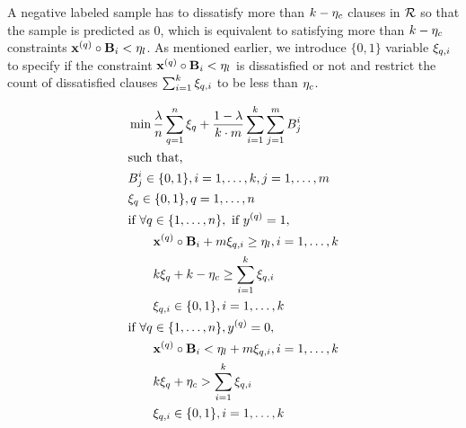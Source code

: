 A negative labeled sample has to dissatisfy  more than $ k-\eta_c $ clauses in $ {\mathcal{R}} $ so that the sample is predicted as $ 0 $, which is equivalent to satisfying  more than $ k-\eta_c$ constraints $ \mathbf{x}^{(q)}\circ \mathbf{B}_i < \eta_l  $. As mentioned earlier, we  introduce $ \{0, 1\} $ variable $ \xi_{q,i} $ to specify if the constraint $ \mathbf{x}^{(q)}\circ \mathbf{B}_i < \eta_l  $ is dissatisfied or not and  restrict the count of dissatisfied clauses $ \sum_{i=1}^k\xi_{q,i} $ to be less than $ \eta_c $. 



\begin{subequations}
	\label{interpretability_crr_eq:ilp}
 \begin{align} 	
 	&\min   \frac{\lambda}{n} \sum_{q=1}^n \xi_q + \frac{1-\lambda}{k\cdot m}\sum_{i=1}^k\sum_{j=1}^m B_j^i \label{interpretability_crr_eq:ilp_obj} \\
 	&\text{such that,} \notag \\
 	&B_j^i \in \{0,1\},  i = 1,\dots,k,  j = 1,\dots,m \label{interpretability_crr_eq:ilp_range}\\
 	& \xi_q \in \{0,1\},q = 1,\dots,n  \label{interpretability_crr_eq:ilp_range_2}\\
 	&\text{if }  \forall q \in \{1,\dots,n\},\text{ if }  y^{(q)}=1, \label{interpretability_crr_eq:ilp_pos}\\
 	&\qquad \mathbf{x}^{(q)}\circ \mathbf{B}_i+ m\xi_{q,i} \ge \eta_{l},  i = 1,\dots,k  \label{interpretability_crr_eq:ilp_ela_l_pos}\\
 	& \qquad   k\xi_q + k-\eta_c \ge \sum_{i=1}^k \xi_{q,i} \notag \\ &\qquad \xi_{q,i} \in \{0,1\},  i = 1,\dots,k \notag\\
 	&\text{if } \forall q \in \{1,\dots,n\}, y^{(q)}=0, \label{interpretability_crr_eq:ilp_neg}\\
 	&\qquad \mathbf{x}^{(q)}\circ \mathbf{B}_i < \eta_{l} + m  \xi_{q,i},  i = 1,\dots,k \label{interpretability_crr_eq:ilp_ela_l_neg}\\
 	&\qquad  k\xi_q  + \eta_{c} > \sum_{i=1}^k\xi_{q,i} \notag\\ &\qquad \xi_{q,i} \in \{0,1\},  i = 1,\dots,k \notag
\end{align}
\end{subequations}

